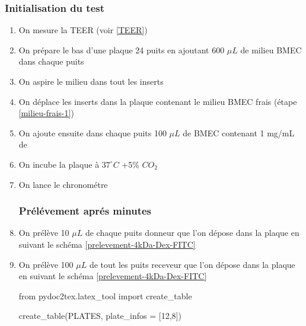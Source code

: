 \subsubsection{Initialisation du test}
\begin{enumerate}
\item On mesure la TEER (voir \ref{TEER})
\item On prépare le bas d'une plaque 24 puits en ajoutant 600 $\mu L$ de milieu BMEC dans chaque puits \label{milieu-frais-1}
\item On aspire le milieu dans tout les inserts
\item On déplace les inserts dans la plaque contenant le milieu BMEC frais (étape \ref{milieu-frais-1})
\item On ajoute ensuite dans chaque puits 100 $\mu L$ de BMEC contenant 1 mg/mL de 
\item On incube la plaque à $37^\circ C$ +5\% $CO_2$
\item On lance le chronométre
\subsubsection{Prélévement aprés  minutes}
\item On prélève 10 $\mu L$ de chaque puits donneur que l'on dépose dans la plaque en suivant le schéma \ref{prelevement-4kDa-Dex-FITC}
\item On prélève 100 $\mu L$ de tout les puits receveur que l'on dépose dans la plaque en suivant le schéma \ref{prelevement-4kDa-Dex-FITC}


\begin{pycode}
from pydoc2tex.latex_tool import create_table

create_table(PLATES, plate_infos = [12,8])
\end{pycode}

    

\end{enumerate}
